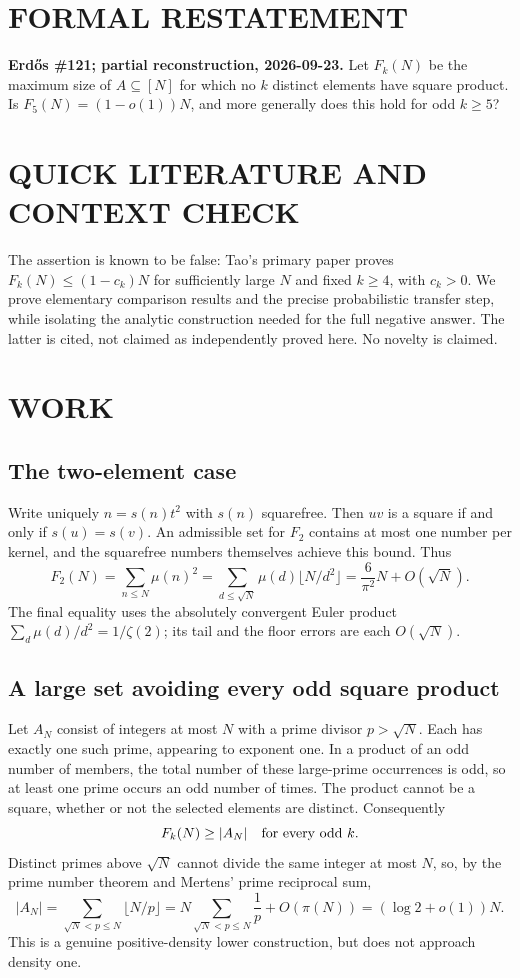 \section{FORMAL RESTATEMENT}
\textbf{Erd\H{o}s \#121; partial reconstruction, 2026-09-23.}
Let $F_k(N)$ be the maximum size of $A\subseteq[N]$ for which no $k$
distinct elements have square product. Is $F_5(N)=(1-o(1))N$, and more
generally does this hold for odd $k\ge5$?

\section{QUICK LITERATURE AND CONTEXT CHECK}
The assertion is known to be false: Tao's primary paper proves
$F_k(N)\le(1-c_k)N$ for sufficiently large $N$ and fixed $k\ge4$, with
$c_k>0$. We prove elementary comparison results and the precise
probabilistic transfer step, while isolating the analytic construction
needed for the full negative answer. The latter is cited, not claimed
as independently proved here. No novelty is claimed.

\section{WORK}
\subsection*{The two-element case}
Write uniquely $n=s(n)t^2$ with $s(n)$ squarefree. Then $uv$ is a
square if and only if $s(u)=s(v)$. An admissible set for $F_2$ contains
at most one number per kernel, and the squarefree numbers themselves
achieve this bound. Thus
\[
 F_2(N)=\sum_{n\le N}\mu(n)^2
 =\sum_{d\le\sqrt N}\mu(d)\lfloor N/d^2\rfloor
 =\frac{6}{\pi^2}N+O(\sqrt N).
\]
The final equality uses the absolutely convergent Euler product
$\sum_d\mu(d)/d^2=1/\zeta(2)$; its tail and the floor errors are each
$O(\sqrt N)$.

\subsection*{A large set avoiding every odd square product}
Let $A_N$ consist of integers at most $N$ with a prime divisor
$p>\sqrt N$. Each has exactly one such prime, appearing to exponent
one. In a product of an odd number of members, the total number of
these large-prime occurrences is odd, so at least one prime occurs an
odd number of times. The product cannot be a square, whether or not
the selected elements are distinct. Consequently
\[
 F_k(N)\ge |A_N|\quad\hbox{for every odd }k.
\]
Distinct primes above $\sqrt N$ cannot divide the same integer at most
$N$, so, by the prime number theorem and Mertens' prime reciprocal sum,
\[
 |A_N|=\sum_{\sqrt N<p\le N}\lfloor N/p\rfloor
 =N\sum_{\sqrt N<p\le N}\frac1p+O(\pi(N))
 =(\log2+o(1))N.                                         \tag{1}
\]
This is a genuine positive-density lower construction, but does not
approach density one.

